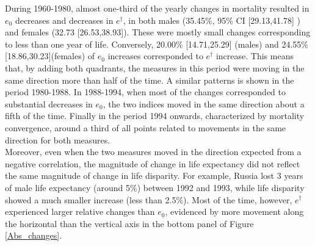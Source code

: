 \documentclass{article}
\begin{document}
\begin{spacing}{1.5}

During 1960-1980, almost one-third of the yearly changes in mortality resulted in $e_0$ decreases and decreases in $e^\dagger$, in both males (35.45\%, 95\% CI [29.13,41.78] ) and females (32.73 [26.53,38.93]). These were mostly small changes corresponding to less than one year of life. Conversely, 20.00\% [14.71,25.29] (males) and 24.55\% [18.86,30.23](females) of $e_0$ increases corresponded to $e^\dagger$ increase. This means that, by adding both quadrants, the measures in this period were moving in the same direction more than half of the time. A similar patterns is shown in the period 1980-1988. In 1988-1994, when most of the changes corresponded to substantial decreases in $e_0$, the two indices moved in the same direction about a fifth of the time. Finally in the period 1994 onwards, characterized by mortality convergence, around a third of all points related to movements in the same direction for both measures. \\

Moreover, even when the two measures moved in the direction expected from a negative correlation, the magnitude of change in life expectancy did not reflect the same magnitude of change in life disparity. For example, Russia lost 3 years of male life expectancy (around 5\%) between 1992 and 1993, while life disparity showed a much smaller increase (less than 2.5\%). Most of the time, however, $e^\dagger$ experienced larger relative changes than $e_0$, evidenced by more movement along the horizontal than the vertical axis in the bottom panel of Figure \ref{Abs_changes}.



\end{spacing}
\end{document}
